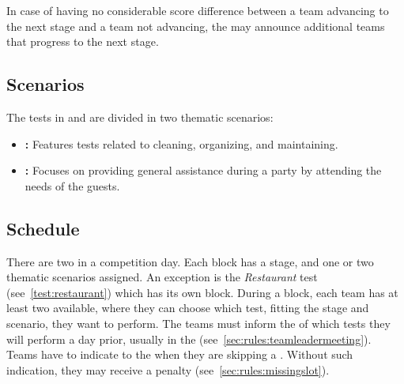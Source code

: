 \noindent In case of having no considerable score difference between a team advancing to the next stage and a team not advancing, the \TC{} may announce additional teams that progress to the next stage.

\subsection{Scenarios}
\label{sec:rules:scenarios}
The tests in \SONE{} and \STWO{} are divided in two thematic scenarios:
\begin{itemize}
	\item \textbf{\Housekeeper{}:} Features tests related to cleaning, organizing, and maintaining.
	
	\item \textbf{\Partyhost{}:} Focuses on providing general assistance during a party by attending the needs of the guests.
\end{itemize}


\subsection{Schedule}
\label{sec:rules:schedule}
There are two \Testblocks{} in a competition day. Each block has a stage, and one or two thematic scenarios assigned. An exception is the \emph{Restaurant} test (see~\ref{test:restaurant}) which has its own block. During a block, each team has at least two \Testslots{} available, where they can choose which test, fitting the stage and scenario, they want to perform. The teams must inform the \OC{} of which tests they will perform a day prior, usually in the \TLM{} (see~\ref{sec:rules:teamleadermeeting}). Teams have to indicate to the  when they are skipping a \Testslot{}. Without such indication, they may receive a penalty (see~\ref{sec:rules:missingslot}).

